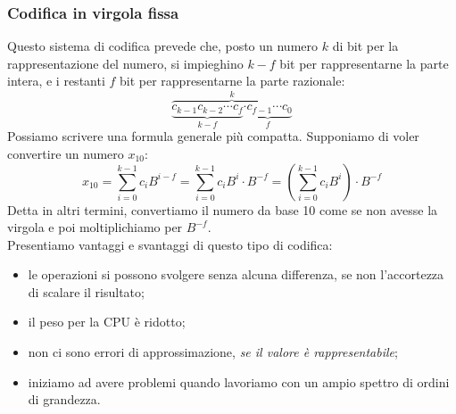 \documentclass[class=book, crop=false]{standalone}
\begin{document}
\subsubsection{Codifica in virgola fissa} Questo sistema di codifica prevede che, posto un numero $k$ di bit per la rappresentazione del numero, si impieghino $k-f$ bit per rappresentarne la parte intera, e i restanti $f$ bit per rappresentarne la parte razionale:
\begin{equation*}
\overbrace{\underbrace{c_{k-1}c_{k-2}\cdots c_{f}}_\text{$k-f$}\underbrace{\cdot c_{f-1}\cdots c_{0}}_\text{$f$}}^\text{$k$}
\end{equation*}
 Possiamo scrivere una formula generale più compatta. Supponiamo di voler convertire un numero $x_{10}$:
 \begin{equation*}
 x_{10}=\sum_{i=0}^{k-1} c_{i}B^{i-f}=\sum_{i=0}^{k-1} c_{i}B^{i}\cdot B^{-f}=(\sum_{i=0}^{k-1} c_{i}B^{i})\cdot B^{-f}
 \end{equation*}
 Detta in altri termini, convertiamo il numero da base 10 come se non avesse la virgola e poi moltiplichiamo per $B^{-f}$.\\
 Presentiamo vantaggi e svantaggi di questo tipo di codifica:
  \begin{itemize}[noitemsep,nolistsep]
  	\item le operazioni si possono svolgere senza alcuna differenza, se non l'accortezza di scalare il risultato;
  	\item il peso per la CPU è ridotto;
  	\item non ci sono errori di approssimazione, \emph{se il valore è rappresentabile};
  	\item iniziamo ad avere problemi quando lavoriamo con un ampio spettro di ordini di grandezza.
  \end{itemize}
\end{document}
